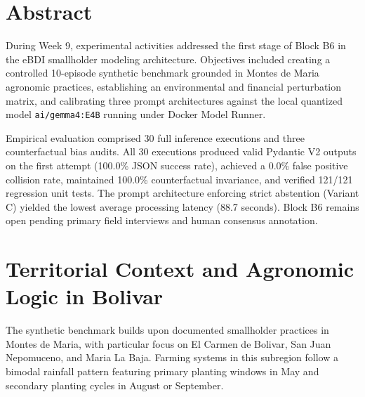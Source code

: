 \documentclass[11pt,a4paper]{article}
\begin{document}
\section{Abstract}

During Week 9, experimental activities addressed the first stage of Block B6 in the eBDI smallholder modeling architecture. Objectives included creating a controlled 10-episode synthetic benchmark grounded in Montes de Maria agronomic practices, establishing an environmental and financial perturbation matrix, and calibrating three prompt architectures against the local quantized model \texttt{ai/gemma4:E4B} running under Docker Model Runner.

Empirical evaluation comprised 30 full inference executions and three counterfactual bias audits. All 30 executions produced valid Pydantic V2 outputs on the first attempt (100.0\% JSON success rate), achieved a 0.0\% false positive collision rate, maintained 100.0\% counterfactual invariance, and verified 121/121 regression unit tests. The prompt architecture enforcing strict abstention (Variant C) yielded the lowest average processing latency (88.7 seconds). Block B6 remains open pending primary field interviews and human consensus annotation.

\section{Territorial Context and Agronomic Logic in Bolivar}

The synthetic benchmark builds upon documented smallholder practices in Montes de Maria, with particular focus on El Carmen de Bolivar, San Juan Nepomuceno, and Maria La Baja. Farming systems in this subregion follow a bimodal rainfall pattern featuring primary planting windows in May and secondary planting cycles in August or September.
\end{document}
